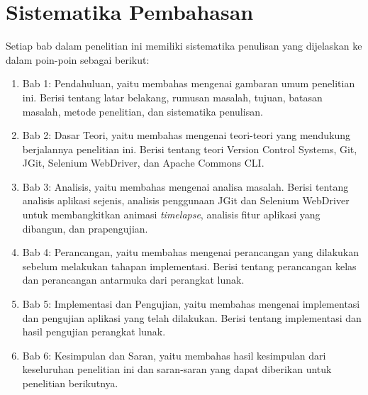 \section{Sistematika Pembahasan}
\label{sec:sispem}
Setiap bab dalam penelitian ini memiliki sistematika penulisan yang dijelaskan ke dalam poin-poin sebagai berikut:
\begin{enumerate}
		\item Bab 1: Pendahuluan, yaitu membahas mengenai gambaran umum penelitian ini. Berisi tentang latar belakang, rumusan masalah, tujuan, batasan masalah, metode penelitian, dan sistematika penulisan.
		\item Bab 2: Dasar Teori, yaitu membahas mengenai teori-teori yang mendukung berjalannya penelitian ini. Berisi tentang teori Version Control Systems, Git, JGit, Selenium WebDriver, dan Apache Commons CLI.
		\item Bab 3: Analisis, yaitu membahas mengenai analisa masalah. Berisi tentang analisis aplikasi sejenis, analisis penggunaan JGit dan Selenium WebDriver untuk membangkitkan animasi \textit{timelapse}, analisis fitur aplikasi yang dibangun, dan prapengujian.
		\item Bab 4: Perancangan, yaitu membahas mengenai perancangan yang dilakukan sebelum melakukan tahapan implementasi. Berisi tentang perancangan kelas dan perancangan antarmuka dari perangkat lunak.
		\item Bab 5: Implementasi dan Pengujian, yaitu membahas mengenai implementasi dan pengujian aplikasi yang telah dilakukan. Berisi tentang implementasi dan hasil pengujian perangkat lunak.
		\item Bab 6: Kesimpulan dan Saran, yaitu membahas hasil kesimpulan dari keseluruhan penelitian ini dan saran-saran yang dapat diberikan untuk penelitian berikutnya.
	\end{enumerate}
